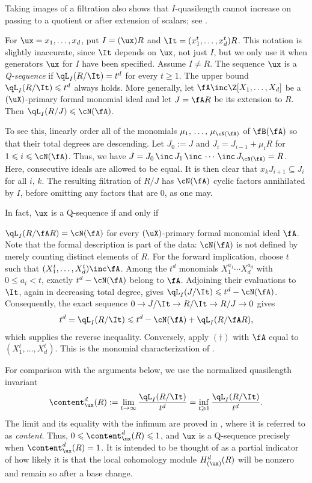 \documentclass[12pt]{amsart}
\theoremstyle{plain}
\theoremstyle{remark}
\theoremstyle{definition}
\numberwithin{equation}{theorem}
\renewcommand{\geq}{\geqslant} \renewcommand{\leq}{\leqslant}
\begin{document}
Taking images of a filtration also shows that $I$-quasilength cannot
increase on passing to a quotient or after extension of scalars;
see \cite[Prop.\,1.1]{HoHu09}.

For $\ux=x_1,\ldots,x_d$, put $I=(\ux)R$ and
$\It=(x_1^t,\ldots,x_d^t)R$. This notation is slightly inaccurate, since $\It$
depends on $\ux$, not just $I$, but we only use it when generators $\ux$ for $I$ have
been specified.  Assume $I\ne R$.
The sequence $\ux$ is a \emph{Q-sequence} if $\qL_I(R/\It)=t^d$ for every $t \geq 1$.
The upper bound $\qL_I(R/\It)\leq t^d$ always holds. More generally,
let $\fA \inc \Z[X_1,\ldots,X_d]$ be a $(\uX)$-primary formal monomial ideal
and let $J=\fA R$ be its extension to $R$. Then
$\qL_I(R/J)\leq \cN(\fA)$. 

\smallskip

To see this, linearly order all of the monomials 
$\mu_1,\, \ldots,\, \mu_{\cN(\fA)}$ of
$\fB(\fA)$ so that their total degrees are descending.
Let $J_0 := J$ and $J_i = J_{i-1} + \mu_i R$ for
$1  \leq i \leq \cN(\fA)$. 
Thus, we have  $J = J_0\, \inc \, J_1 \, \inc\, \cdots \, \inc\, J_{\cN(\fA)} = R$. 
Here, consecutive ideals are allowed to be equal. It is then clear that $x_kJ_{i+1} \subseteq J_i$ for all $i,\, k$. 
The resulting filtration of $R/J$ has
$\cN(\fA)$ cyclic factors annihilated by $I$, before 
omitting  any factors that are 0, as one may.

In fact, $\ux$ is a Q-sequence if and only if
\bensp{$(\dagger)$}
\item  $\qL_I(R/\fA R)=\cN(\fA)$ for every $(\uX)$-primary  formal monomial ideal $\fA$.
\een
Note that the formal description is part of the data: $\cN(\fA)$ is not
defined by merely counting distinct elements of $R$.
For the forward implication, choose $t$ such that
$(X_1^t,\ldots,X_d^t) \inc \fA$. Among the $t^d$ monomials
$X_1^{a_1}\cdots X_d^{a_d}$ with $0\leq a_i<t$, exactly
$t^d-\cN(\fA)$ belong to $\fA$. Adjoining their evaluations to
$\It$, again in decreasing total degree, gives $\qL_I(J/\It)\leq t^d-\cN(\fA)$.
Consequently, the exact sequence $0\to J/\It \to R/\It\to R/J \to 0$ gives
\[
 t^d=\qL_I(R/\It)
       \leq t^d-\cN(\fA)+\qL_I(R/\fA R),
\]
which supplies the reverse inequality. Conversely, apply
$(\dagger)$ with $\fA$ equal to $(X_1^t,\ldots,X_d^t)$.
This is the monomial characterization of
\cite[Remark~3.7]{HoHu09}. 

For comparison with the arguments below, we use the normalized
quasilength invariant
\[
 \content^d_{\ux}(R)
      :=\lim_{t\to\infty}\frac{\qL_I(R/\It)}{t^d}
       =\inf_{t\geq1}\frac{\qL_I(R/\It)}{t^d}.
\]
The limit and its equality with the infimum are proved in
\cite[Theorem~2.4]{HoHu09}, where it is referred to as {\it content}. 
Thus, $0\leq\content^d_{\ux}(R)\leq1$,
and $\ux$ is a Q-sequence precisely when
$\content^d_{\ux}(R)=1$. It is intended to be thought of as a partial indicator
of how likely it is that the local cohomology module $H^d_{(\ux)}(R)$ will be nonzero 
and remain so after a base change.
\end{document}
